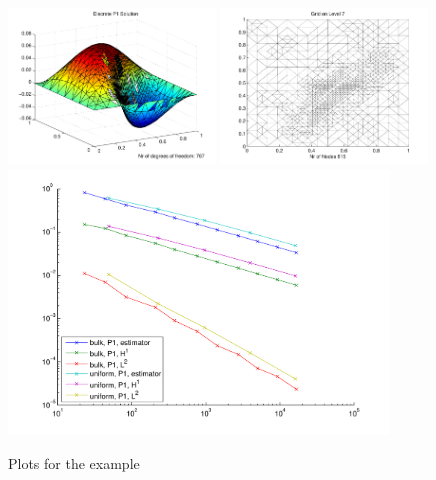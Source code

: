 \begin{figure}[ht!]
\includegraphics[width= 0.49\textwidth]{images/sect_QuickStart_Elliptic_Waterfall_U}
\includegraphics[width= 0.49\textwidth]{images/sect_QuickStart_Elliptic_Waterfall_Mesh}\bigskip\\
\includegraphics[width=0.9\textwidth]{images/sect_QuickStart_Elliptic_Waterfall_Error}
\caption{ Plots for the example }
\label{sect:QuickStart:fig:Elliptic_Waterfall}
\end{figure}

\clearpage